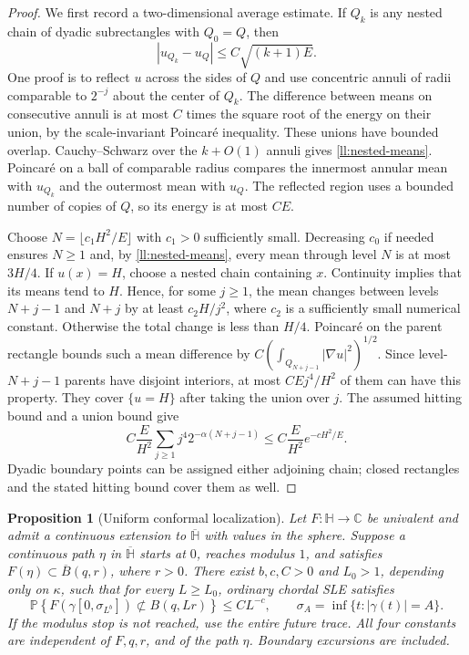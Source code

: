\documentclass[11pt]{article}
\newtheorem{proposition}[theorem]{Proposition}
\theoremstyle{definition}
\theoremstyle{remark}
\numberwithin{equation}{section}
\begin{document}
\begin{proof}
We first record a two-dimensional average estimate. If $Q_k$ is
any nested chain of dyadic subrectangles with $Q_0=Q$, then
\begin{equation}
 |u_{Q_k}-u_Q|\le C\sqrt{(k+1)E}.
 \label{ll:nested-means}
\end{equation}
One proof is to reflect $u$ across the sides of $Q$ and use
concentric annuli of radii comparable to $2^{-j}$ about the center
of $Q_k$. The difference between means on consecutive annuli is
at most $C$ times the square root of the energy on their union,
by the scale-invariant Poincar\'e inequality. These unions have
bounded overlap. Cauchy--Schwarz over the $k+O(1)$ annuli gives
\eqref{ll:nested-means}. Poincar\'e on a ball of comparable radius
compares the innermost annular mean with $u_{Q_k}$ and the outermost
mean with $u_Q$. The reflected region uses a bounded number of
copies of $Q$, so its energy is at most $CE$.

Choose $N=\lfloor c_1H^2/E\rfloor$ with $c_1>0$ sufficiently small.
Decreasing $c_0$ if needed ensures $N\ge1$ and, by
\eqref{ll:nested-means}, every mean through level $N$ is at most
$3H/4$. If $u(x)=H$, choose a nested chain containing $x$.
Continuity implies that its means tend to $H$. Hence, for some
$j\ge1$, the mean changes between levels $N+j-1$ and $N+j$ by at
least $c_2H/j^2$, where $c_2$ is a sufficiently small numerical
constant. Otherwise the total change is less than $H/4$.
Poincar\'e on the parent rectangle bounds such a mean difference
by $C(\int_{Q_{N+j-1}}|\nabla u|^2)^{1/2}$.
Since level-$N+j-1$ parents have disjoint interiors, at most
$CEj^4/H^2$ of them can have this property.
They cover $\{u=H\}$ after taking the union over $j$.
The assumed hitting bound and a union bound give
\[
 C\frac E{H^2}\sum_{j\ge1}j^4
                   2^{-\alpha(N+j-1)}
 \le C\frac E{H^2}e^{-cH^2/E}.
\]
Dyadic boundary points can be assigned either adjoining chain; closed
rectangles and the stated hitting bound cover them as well.
\end{proof}

\begin{proposition}[Uniform conformal localization]\label{ll:localization}
Let $F:\mathbb H\to\mathbb C$ be univalent and admit a continuous
extension to $\overline{\mathbb H}$ with values in the sphere.
Suppose a continuous path $\eta$ in $\overline{\mathbb H}$ starts
at $0$, reaches modulus $1$, and satisfies
$F(\eta)\subset\overline B(q,r)$, where $r>0$.
There exist $b,c,C>0$ and $L_0>1$, depending only on $\kappa$, such
that for every $L\ge L_0$,
ordinary chordal SLE satisfies
\[
 \mathbb P\left\{F(\gamma[0,\sigma_{L^b}])
                      \not\subset B(q,Lr)\right\}
       \le CL^{-c},
 \qquad
 \sigma_A=\inf\{t:|\gamma(t)|=A\}.
\]
If the modulus stop is not reached, use the entire future trace.
All four constants are independent of $F,q,r$, and of the path $\eta$.
Boundary excursions are included.
\end{proposition}
\end{document}
